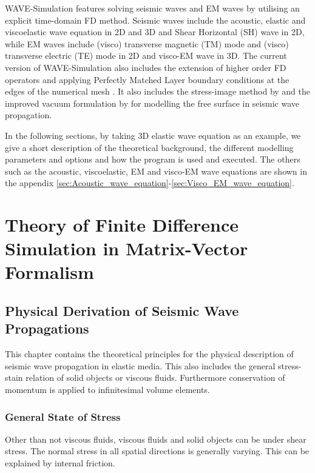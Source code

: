 \documentclass[pdftex,a4paper,parskip,listof=totoc,bibliography=totoc,onehalfspacing,12pt]{scrreprt}
\begin{document}
WAVE-Simulation features solving seismic waves and EM waves by utilising an explicit time-domain FD method. Seismic waves include the acoustic, elastic and viscoelastic wave equation in 2D and 3D and Shear Horizontal (SH) wave in 2D, while EM waves include (visco) transverse magnetic (TM) mode and (visco) transverse electric (TE) mode in 2D and visco-EM wave in 3D. The current version of WAVE-Simulation also includes the extension of higher order FD operators and applying Perfectly Matched Layer boundary conditions at the edges of the numerical mesh \citep{berenger1994perfectly,roden2000convolution,komatitsch2007unsplit}. It also includes the stress-image method by \cite{levander1988fourth} and the improved vacuum formulation by \cite{zeng2012improved} for modelling the free surface in seismic wave propagation. 

In the following sections, by taking 3D elastic wave equation as an example, we give a short description of the theoretical background, the different modelling parameters and options and how the program is used and executed. The others such as the acoustic, viscoelastic, EM and visco-EM wave equations are shown in the appendix \ref{sec:Acoustic_wave_equation}-\ref{sec:Visco_EM_wave_equation}.

\cleardoublepage
\part{Theory of Finite Difference Simulation in Matrix-Vector Formalism}

\chapter{Physical Derivation of Seismic Wave Propagations}

This chapter contains the theoretical principles for the physical description of seismic wave propagation in elastic media. This also includes the general stress-stain relation of solid objects or viscous fluids. Furthermore conservation of momentum is applied to infinitesimal volume elements.

\section{General State of Stress}
\label{sec:AllSp}

Other than not viscous fluids, viscous fluids and solid objects can be under shear stress. The normal stress in all spatial directions is generally varying. This can be explained by internal friction.
\end{document}
